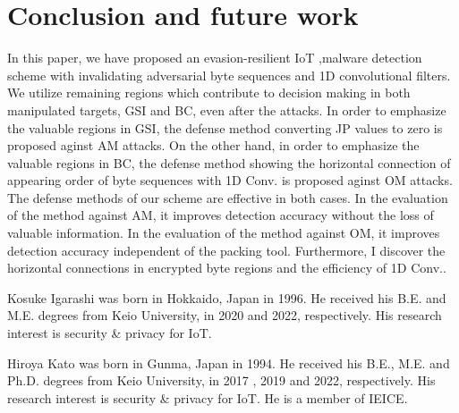 \documentclass{ieeeaccess}
\begin{document}
\section{Conclusion and future work} \label{sec:conclusion}
In this paper, we have proposed an evasion-resilient IoT ,malware detection scheme with invalidating adversarial byte sequences and 1D convolutional filters. 
We utilize remaining regions which contribute to decision making in both manipulated targets, GSI and BC, even after the attacks.
In order to emphasize the valuable regions in GSI, the defense method converting JP values to zero is proposed aginst AM attacks.
On the other hand, in order to emphasize the valuable regions in BC, the defense method showing the horizontal connection of appearing order of byte sequences with 1D Conv. is proposed aginst OM attacks.
The defense methods of our scheme are effective in both cases.
In the evaluation of the method against AM, it improves detection accuracy without the loss of valuable information.
In the evaluation of the method against OM, it improves detection accuracy independent of the packing tool.
Furthermore, I discover the horizontal connections in encrypted byte regions and the efficiency of 1D Conv..



\begin{IEEEbiography}{Kosuke Igarashi} was born in Hokkaido, Japan in 1996. He received his B.E. and M.E. degrees from Keio University, in 2020 and 2022, respectively. His research interest is security \& privacy for IoT.
\end{IEEEbiography}

\begin{IEEEbiography}{Hiroya Kato} was born in Gunma, Japan in 1994. He received his B.E., M.E. and Ph.D. degrees from Keio University, in 2017 , 2019 and 2022, respectively. His research interest is security \& privacy for IoT. He is a member of IEICE.
\end{IEEEbiography} 
\end{document}
